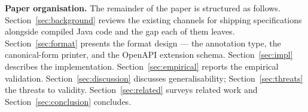 \textbf{Paper organisation.} The remainder of the paper is structured as follows. Section~\ref{sec:background} reviews the existing channels for shipping specifications alongside compiled Java code and the gap each of them leaves. Section~\ref{sec:format} presents the format design --- the annotation type, the canonical-form printer, and the OpenAPI extension schema. Section~\ref{sec:impl} describes the implementation. Section~\ref{sec:empirical} reports the empirical validation. Section~\ref{sec:discussion} discusses generalisability; Section~\ref{sec:threats} the threats to validity. Section~\ref{sec:related} surveys related work and Section~\ref{sec:conclusion} concludes.
